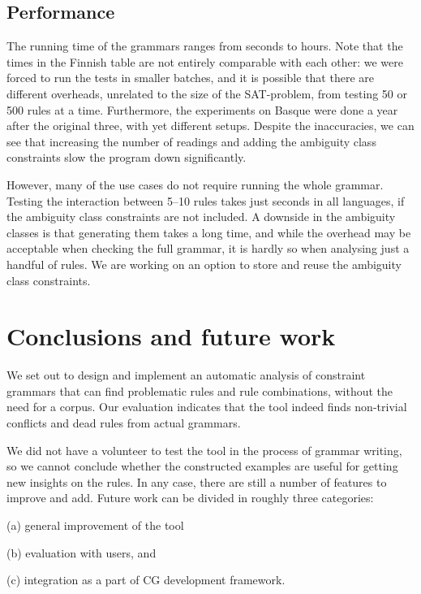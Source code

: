 {{\subsection{Performance} 
The running time of the grammars ranges from seconds to hours. 
Note that the times in the Finnish table are not entirely comparable with each other: we were forced to run the tests in smaller batches, and it is possible that there are different overheads, unrelated to the size of the SAT-problem, from testing 50 or 500 rules at a time.
Furthermore, the experiments on Basque were done a year after the original three, with yet different setups.
Despite the inaccuracies, we can see that increasing the number of readings 
and adding the ambiguity class constraints
slow the program down significantly.

However, many of the use cases do not require running the whole
grammar. Testing the interaction between 5--10 rules takes just
seconds in all languages, if the ambiguity class constraints are not included. 
A downside in the ambiguity classes is that generating them takes a long time, 
and while the overhead may be acceptable when checking the full grammar,
it is hardly so when analysing just a handful of rules. 
We are working on an option to store and reuse the ambiguity class constraints.


\section{Conclusions and future work}


We set out to design and implement an automatic analysis of constraint grammars that can find problematic rules and rule combinations, without the need for a corpus.
Our evaluation indicates that the tool indeed finds non-trivial conflicts and dead rules
from actual grammars. 

We did not have a volunteer to test the tool in
the process of grammar writing, so we cannot conclude whether the
constructed examples are useful for getting new insights on the rules.
In any case, there are still a number of features to improve and add.
Future work can be divided in roughly three categories: 
\begin{inparaenum}
\item[(a)] general improvement of the tool
\item[(b)] evaluation with users, and 
\item[(c)] integration as a part of CG development framework.
\end{inparaenum}

}}
